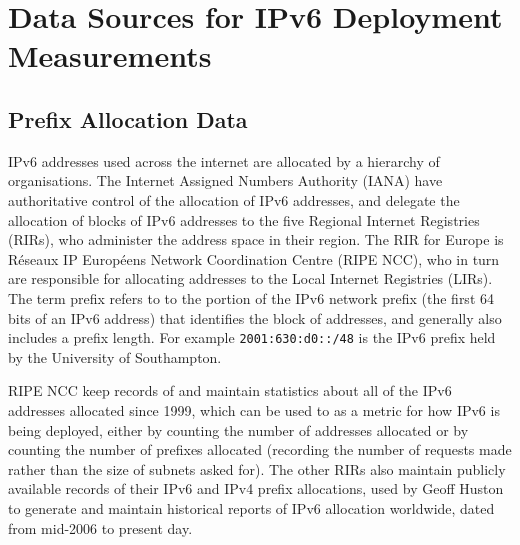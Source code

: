 \section{Data Sources for IPv6 Deployment Measurements}

\subsection{Prefix Allocation Data}

IPv6 addresses used across the internet are allocated by a hierarchy of organisations.
The Internet Assigned Numbers Authority (IANA) have authoritative control of the
allocation of IPv6 addresses, and delegate the allocation of blocks of IPv6
addresses to the five Regional Internet Registries (RIRs), who administer the
address space in their region. The RIR for Europe is Réseaux IP Européens
Network Coordination Centre (RIPE NCC), who in turn are responsible for
allocating addresses to the Local Internet Registries (LIRs). The term prefix
refers to to the portion of the IPv6 network prefix (the first 64 bits of an
IPv6 address) that identifies the block of addresses, and generally also
includes a prefix length. For example \verb+2001:630:d0::/48+ is the IPv6 prefix held by the
University of Southampton.

RIPE NCC keep records of and maintain statistics about all of the IPv6 addresses
allocated since 1999, which can be used to as a metric for how IPv6 is being
deployed, either by counting the number of addresses allocated or by counting
the number of prefixes allocated (recording the number of requests made rather
than the size of subnets asked for). The other RIRs also maintain publicly
available records of their IPv6 and IPv4 prefix allocations, used by Geoff
Huston to generate and maintain historical
reports of IPv6 allocation worldwide, dated from mid-2006 to
present day\cite{huston_ipv6_2013}.

